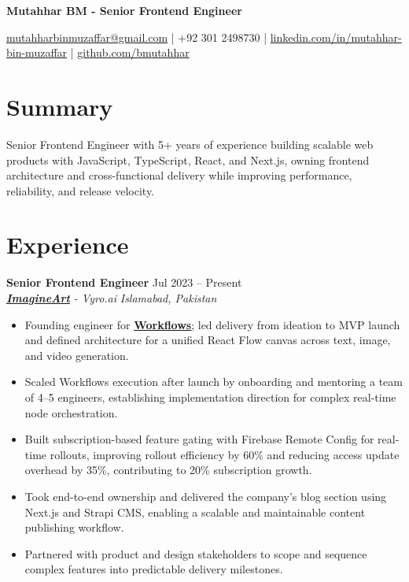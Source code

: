 \documentclass[9pt,letterpaper]{article}
\newcommand{\resumeHeader}[1]{%
  \begin{center}
    \vspace{2pt}
    {\fontsize{18pt}{20pt}\selectfont\bfseries #1\par}
    \vspace{4pt}
  \end{center}
}
\newcommand{\role}[4]{\textbf{#1} \hfill #2 \\
\textit{#3} \hfill \textit{#4}\\[-4pt]}
\begin{document}
\resumeHeader{Mutahhar BM - Senior Frontend Engineer}
\begin{center}
\fontsize{9pt}{11pt}\selectfont
\href{mailto:mutahharbinmuzaffar@gmail.com}{mutahharbinmuzaffar@gmail.com} \;|\; +92 301 2498730 \;|\;
\href{https://www.linkedin.com/in/mutahhar-bin-muzaffar}{linkedin.com/in/mutahhar-bin-muzaffar} \;|\;
\href{https://github.com/bmutahhar}{github.com/bmutahhar}
\end{center}

\section*{Summary}
Senior Frontend Engineer with 5+ years of experience building scalable web products with JavaScript, TypeScript, React, and Next.js, owning frontend architecture and cross-functional delivery while improving performance, reliability, and release velocity.

\section*{Experience}
\role{Senior Frontend Engineer}{Jul 2023 -- Present}{\href{https://www.imagine.art/}{\textbf{\underline{ImagineArt}}} - Vyro.ai}{Islamabad, Pakistan}
\begin{itemize}[leftmargin=*, itemsep=0pt, topsep=0pt, partopsep=0pt, parsep=0pt, after=\vspace{2pt}]
  \item Founding engineer for \href{https://www.imagine.art/flow}{\textbf{\underline{Workflows}}}; led delivery from ideation to MVP launch and defined architecture for a unified React Flow canvas across text, image, and video generation.
  \item Scaled Workflows execution after launch by onboarding and mentoring a team of 4--5 engineers, establishing implementation direction for complex real-time node orchestration.
  \item Built subscription-based feature gating with Firebase Remote Config for real-time rollouts, improving rollout efficiency by 60\% and reducing access update overhead by 35\%, contributing to 20\% subscription growth.
  \item Took end-to-end ownership and delivered the company's blog section using Next.js and Strapi CMS, enabling a scalable and maintainable content publishing workflow.
  \item Partnered with product and design stakeholders to scope and sequence complex features into predictable delivery milestones.

\end{itemize}
\end{document}
